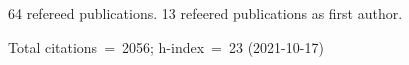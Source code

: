 64 refereed publications. 13 refeered publications as first author.

Total citations~=~2056; h-index~=~23 (2021-10-17)